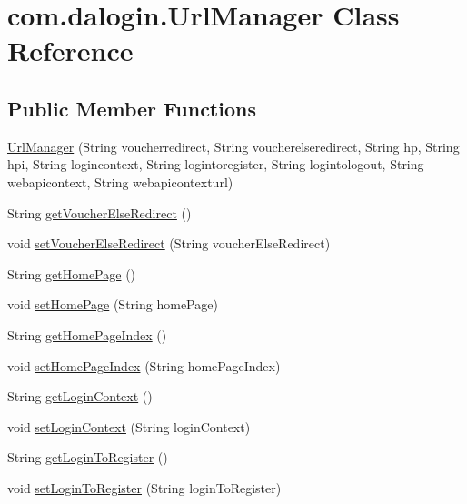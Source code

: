 \hypertarget{classcom_1_1dalogin_1_1_url_manager}{}\section{com.\+dalogin.\+Url\+Manager Class Reference}
\label{classcom_1_1dalogin_1_1_url_manager}
\subsection*{Public Member Functions}
\begin{DoxyCompactItemize}
\item 
\hyperlink{classcom_1_1dalogin_1_1_url_manager_a38786ff9058bce6b0d4993d3844fcd38}{Url\+Manager} (String voucherredirect, String voucherelseredirect, String hp, String hpi, String logincontext, String logintoregister, String logintologout, String webapicontext, String webapicontexturl)
\item 
String \hyperlink{classcom_1_1dalogin_1_1_url_manager_a854c54fa3a3e289e2ded73bdb91e2c54}{get\+Voucher\+Else\+Redirect} ()
\item 
void \hyperlink{classcom_1_1dalogin_1_1_url_manager_a47aeb698bb569a35a3299ef737c7e4da}{set\+Voucher\+Else\+Redirect} (String voucher\+Else\+Redirect)
\item 
String \hyperlink{classcom_1_1dalogin_1_1_url_manager_a612504bd73f0ba1a8411d7866a5b2543}{get\+Home\+Page} ()
\item 
void \hyperlink{classcom_1_1dalogin_1_1_url_manager_adfc73042e559d077aaecc63ac7a98982}{set\+Home\+Page} (String home\+Page)
\item 
String \hyperlink{classcom_1_1dalogin_1_1_url_manager_a66822569c3877f0c044ff0078b740140}{get\+Home\+Page\+Index} ()
\item 
void \hyperlink{classcom_1_1dalogin_1_1_url_manager_a3a19e29c5f0e4952062bdc82ca65d483}{set\+Home\+Page\+Index} (String home\+Page\+Index)
\item 
String \hyperlink{classcom_1_1dalogin_1_1_url_manager_a398f603ddb5cda8e053aa395c8c5bb23}{get\+Login\+Context} ()
\item 
void \hyperlink{classcom_1_1dalogin_1_1_url_manager_af86547d3389b02da8115f91cdb02c570}{set\+Login\+Context} (String login\+Context)
\item 
String \hyperlink{classcom_1_1dalogin_1_1_url_manager_a3b86c3b2a31e580e690e82bf3240d05b}{get\+Login\+To\+Register} ()
\item 
void \hyperlink{classcom_1_1dalogin_1_1_url_manager_ab782533cae2700e5fe109d2b42f8383d}{set\+Login\+To\+Register} (String login\+To\+Register)

\end{DoxyCompactItemize}
